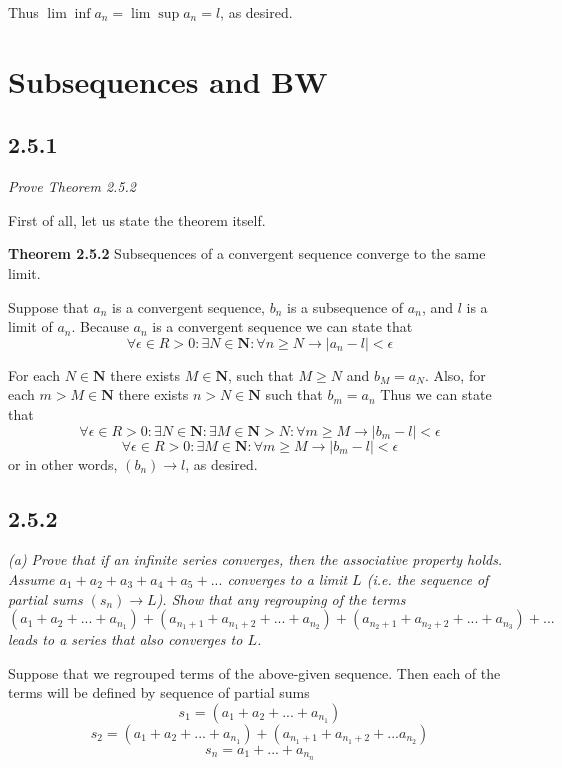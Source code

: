 \documentclass[11pt,oneside,titlepage]{book}
\begin{document}
Thus $\lim \inf a_n = \lim \sup a_n = l$, as desired.

\section{Subsequences and BW}

\subsection*{2.5.1}
\textit{Prove Theorem 2.5.2}

First of all, let us state the theorem itself.

\textbf{Theorem 2.5.2}
Subsequences of a convergent sequence converge to the same limit.

Suppose that $a_n$ is a convergent sequence,  $b_n$ is  a subsequence of
$a_n$, and $l$ is a limit of $a_n$.  Because $a_n$ is a convergent sequence
we can state that 
$$\forall \epsilon \in R > 0: \exists N \in \textbf{N}: \forall n \geq N \to
|a_n - l| < \epsilon$$

For each $N \in \textbf{N}$ there exists $M \in \textbf{N}$, such that
$M \geq N$ and  $b_M = a_N$. Also, for each $m > M \in \textbf{N}$ there exists
$n > N \in \textbf{N}$ such that $b_m = a_n$
Thus we can state that 
$$\forall \epsilon \in R > 0: \exists N \in \textbf{N}: \exists M \in \textbf{N} > N:  \forall m \geq M \to |b_m - l| < \epsilon$$
$$\forall \epsilon \in R > 0:  \exists M \in \textbf{N} :  \forall m \geq M \to |b_m - l| < \epsilon$$
or in other words, $(b_n) \to l$, as desired.

\subsection*{2.5.2}
\textit{(a) Prove that if an infinite series converges, then the associative
  property holds. Assume $a_1 + a_2 + a_3 + a_4 + a_5 + ...$ converges
  to a limit $L$ (i.e. the sequence of partial sums $(s_n) \to L$). Show that
  any regrouping of the terms}
$$(a_1 + a_2 + ... + a_{n_1}) + (a_{n_1 + 1} + a_{n_1 + 2} + ... + a_{n_2}) +
(a_{n_2 + 1} + a_{n_2 + 2} + ... + a_{n_3}) + ...$$
\textit{leads to a series that also converges to $L$.}

Suppose that we regrouped terms of the above-given sequence. Then each
of the terms will be defined by sequence of partial sums
$$s_1 = (a_1 + a_2 + ... + a_{n_1})$$
$$s_2 = (a_1 + a_2 + ... + a_{n_1}) + (a_{n_1 + 1} + a_{n_1 + 2 } + ... a_{n_2})$$
$$s_n = a_1 + ... + a_{n_n}$$
\end{document}

